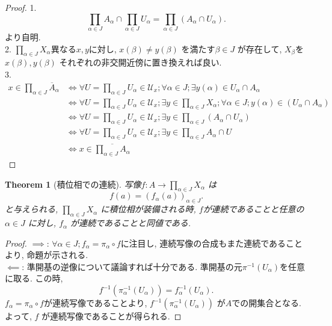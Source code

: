\documentclass[lualatex]{ltjsbook}
\newcommand{\cl}[1]{\overline{ #1}  }
\newtheorem{theorem}{Theorem}[section]
\theoremstyle{remark}
\theoremstyle{plain}
\begin{document}
\begin{proof}
	1.\[
\prod_{\alpha \in J} A_{\alpha}  \cap \prod_{\alpha \in J} U_{\alpha}  = \prod_{\alpha \in J}\left( A_{\alpha}  \cap U_{\alpha}	\right)
	.\] より自明.\\
	2. $\prod_{\alpha \in J} X_{\alpha}  $異なる$x,y$に対し, $x(\beta) \neq y(\beta)$ を満たす$\beta \in J$ が存在して, 
	$X_{\beta}$を $x\left( \beta \right) , y\left( \beta \right) $ それぞれの非交開近傍に置き換えれば良い.\\
	3. 
	$$
	\begin{aligned}
		x \in \prod_{\alpha \in J} \cl{A}_{\alpha} & \iff \forall U = \prod_{\alpha \in J} U_{\alpha}   \in \mathcal{U}_x; \forall \alpha \in J ; \exists y(\alpha) \in U_{\alpha} \cap A_{\alpha}\\
   &\iff \forall U = \prod_{\alpha \in J} U_{\alpha} \in \mathcal{U}_x; \exists y \in \prod_{\alpha \in J} X_{\alpha}  ; \forall \alpha \in J; y(\alpha) \in \left( U_{\alpha} \cap  A_{\alpha} \right) \\
   &\iff \forall  U = \prod_{\alpha \in J} U_{\alpha} \in \mathcal{U}_x; \exists y \in \prod_{\alpha \in J} (A_{\alpha} \cap U_{\alpha}) \\
   &\iff \forall U = \prod_{\alpha \in J} U_{\alpha} \in \mathcal{U}_x; \exists y \in \prod_{\alpha \in J} A_{\alpha} \cap U \\
   &   \iff x \in \cl{\prod_{\alpha \in J} A_{\alpha}  }
	\end{aligned}
	$$

\end{proof}

\begin{theorem}[積位相での連続]
	写像$f: A\to  \prod_{\alpha \in J} X_{\alpha}  $ は
	\[
	f(a) = (f_{\alpha}(a))_{\alpha \in J}
	.\] 
	と与えられる, $\prod_{\alpha \in J} X_{\alpha}  $ に積位相が装備される時, $f$が連続であることと任意の $\alpha \in J$ に対し, $f_{\alpha}$ が連続であることと同値である.
\end{theorem}

\begin{proof}
	$\implies$: $\forall \alpha \in J; f_{\alpha} = \pi_{\alpha} \circ f$に注目し, 連続写像の合成もまた連続であることより, 命題が示される.\\
	 $\impliedby$: 準開基の逆像について議論すれば十分である. 準開基の元$\pi^{-1}\left( U_{\alpha}\right) $を任意に取る. この時, 
	  \[
	 f^{-1}\left(\pi_{\alpha} ^{-1} \left( U_{\alpha}  \right) \right) = f_{\alpha}^{-1}\left( U_{\alpha} \right) 
	 .\] 
	 $f_{\alpha} = \pi_{\alpha} \circ f$が連続写像であることより, 
	 $f^{-1} \left( \pi_{\alpha} ^{-1}\left( U_{\alpha} \right)  \right) $ が$A$での開集合となる. 
	 よって,  $f$ が連続写像であることが得られる. 
\end{proof}
\end{document}
